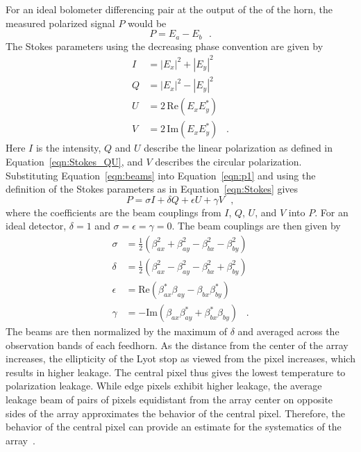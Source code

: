 For an ideal bolometer differencing pair at the output of the of the horn, the measured polarized signal $P$ would be
\begin{equation}\label{eqn:p1}
P=E_a-E_b \,\,\,\,.
\end{equation}
The Stokes parameters using the decreasing phase convention are given by
\begin{align}\label{eqn:Stokes}
I & =  |E_{x}|^2+ |E_{y}|^2  \nonumber \\
Q & =   |E_{x}|^2- |E_{y}|^2  \nonumber \\
U & =  2\,\mathrm{Re}(E_{x} E_{y}^{*}) \nonumber \\
V & =  2\,\mathrm{Im}(E_{x} E_{y}^{*})\,\,\,\,\,.
\end{align}
Here $I$ is the intensity, $Q$ and $U$ describe the linear polarization as defined in Equation~\ref{eqn:Stokes_QU}, and $V$ describes the circular polarization. Substituting Equation~\ref{eqn:beams} into Equation~\ref{eqn:p1} and using the definition of the Stokes parameters  as in Equation~\ref{eqn:Stokes} gives
\begin{equation}
P=\sigma I + \delta Q + \epsilon U+ \gamma V\,\,\,\, ,
\end{equation}
where the coefficients are the beam couplings from $I$, $Q$, $U$, and $V$ into $P$. For an ideal detector, $\delta=1$ and $\sigma=\epsilon=\gamma=0$. The beam couplings are then given by
\begin{align}\label{eqn:leakage beams}
\sigma & =  \frac{1}{2} (\beta_{ax}^2 + \beta_{ay}^2 - \beta_{bx}^2 - \beta_{by}^2) \\
\delta & =   \frac{1}{2} (\beta_{ax}^2 - \beta_{ay}^2 - \beta_{bx}^2 + \beta_{by}^2) \\
\epsilon & =  \mathrm{Re}(\beta_{ax}^{*} \beta_{ay} - \beta_{bx}\beta_{by}^{*} )  \\
\gamma & =  -\mathrm{Im}(\beta_{ax} \beta_{ay}^{*} + \beta_{bx}^{*}\beta_{by} )\,\,\,\,\,.
\end{align}
The beams are then normalized by the maximum of $\delta$ and averaged across the observation bands of each feedhorn. As the distance from the center of the array increases, the ellipticity of the Lyot stop as viewed from the pixel increases, which results in higher leakage. The central pixel thus gives the lowest temperature to polarization leakage. While edge pixels exhibit higher leakage, the average leakage beam of pairs of pixels equidistant from the array center on opposite sides of the array approximates the behavior of the central pixel. Therefore, the behavior of the central pixel can provide an estimate for the systematics of the array~\cite{Simon_Thesis_2016}.

